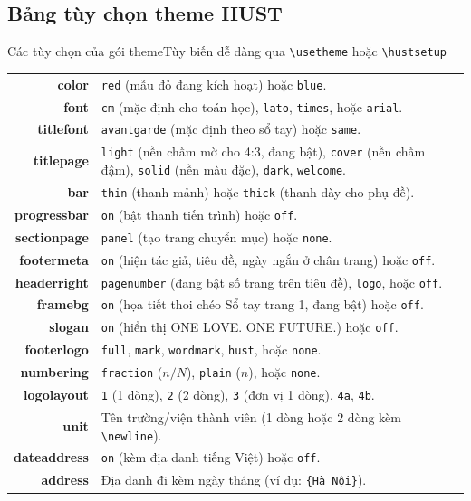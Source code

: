\documentclass[aspectratio=43,10pt]{beamer}
\begin{document}
\subsection{Bảng tùy chọn theme HUST}
\begin{frame}{Các tùy chọn của gói theme}{Tùy biến dễ dàng qua \texttt{\textbackslash usetheme} hoặc \texttt{\textbackslash hustsetup}}
  \scriptsize
  \centering
  \begin{tabularx}{\textwidth}{>{\ttfamily\bfseries\color{hustmain}}r >{\small}X}
    color       & \texttt{red} (mẫu đỏ đang kích hoạt) hoặc \texttt{blue}. \\
    font        & \texttt{cm} (mặc định cho toán học), \texttt{lato}, \texttt{times}, hoặc \texttt{arial}. \\
    titlefont   & \texttt{avantgarde} (mặc định theo sổ tay) hoặc \texttt{same}. \\
    titlepage   & \texttt{light} (nền chấm mờ cho 4:3, đang bật), \texttt{cover} (nền chấm đậm), \texttt{solid} (nền màu đặc), \texttt{dark}, \texttt{welcome}. \\
    bar         & \texttt{thin} (thanh mảnh) hoặc \texttt{thick} (thanh dày cho phụ đề). \\
    progressbar & \texttt{on} (bật thanh tiến trình) hoặc \texttt{off}. \\
    sectionpage & \texttt{panel} (tạo trang chuyển mục) hoặc \texttt{none}. \\
    footermeta  & \texttt{on} (hiện tác giả, tiêu đề, ngày ngắn ở chân trang) hoặc \texttt{off}. \\
    headerright & \texttt{pagenumber} (đang bật số trang trên tiêu đề), \texttt{logo}, hoặc \texttt{off}. \\
    framebg     & \texttt{on} (họa tiết thoi chéo Sổ tay trang 1, đang bật) hoặc \texttt{off}. \\
    slogan      & \texttt{on} (hiển thị ONE LOVE. ONE FUTURE.) hoặc \texttt{off}. \\
    footerlogo  & \texttt{full}, \texttt{mark}, \texttt{wordmark}, \texttt{hust}, hoặc \texttt{none}. \\
    numbering   & \texttt{fraction} ($n/N$), \texttt{plain} ($n$), hoặc \texttt{none}. \\
    logolayout  & \texttt{1} (1 dòng), \texttt{2} (2 dòng), \texttt{3} (đơn vị 1 dòng), \texttt{4a}, \texttt{4b}. \\
    unit        & Tên trường/viện thành viên (1 dòng hoặc 2 dòng kèm \texttt{\textbackslash newline}). \\
    dateaddress & \texttt{on} (kèm địa danh tiếng Việt) hoặc \texttt{off}. \\
    address     & Địa danh đi kèm ngày tháng (ví dụ: \texttt{\{Hà Nội\}}). \\
  \end{tabularx}
\end{frame}
\end{document}
